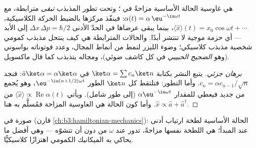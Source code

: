\begin{proposition}\label{prop:b3:harmonic-oscillator:coherent-motion}
 هي غاوسية الحالة الأساسية مزاحةً في ؛ وتحت تطور المذبذب \emph{تبقى} مترابطة، مع
$\alpha(t) = \alpha\,\eu^{-\iu\omega t}$: فينفّذ مركزها بالضبط
الحركة الكلاسيكية، $\langle\hat x\rangle(t) =
x_0\cos\omega t + \cdots$، بينما يبقى عرضاها في الحدّ الأدنى
$\Delta x\,\Delta p = \hbar/2$ إلى الأبد --- أي حزمة موجية لا
تنتشر أبدًا. والحالات المترابطة هي كيف ينتحل مذبذب كمومي شخصية
مذبذب كلاسيكي؛ وضوء الليزر  لنمط من أنماط المجال،
وعدد فوتوناته بواسوني (وهو \emph{الضجيج الحبيبي} في كل
كاشف ضوئي)، ومجاله يتذبذب كما قال ماكسويل.
\end{proposition}

\begin{proof}[برهان جزئي]
يتبع النشر بكتابة $\ket\alpha = \sum c_n\ket n$ في
$\hat a\ket\alpha = \alpha\ket\alpha$: فنجد $c_n = \alpha c_{n-1}/\sqrt
n$. وأما التطور: فتلتقط كل $\ket n$ الطور $\eu^{-\iu(n + 1/2)\omega t}$،
وهو يُجمع من جديد فيعطي  للمقدار $\alpha\eu^{-\iu\omega t}$
(إلى طور شامل). ويأتي $\langle\hat x\rangle \propto
\operatorname{Re}\alpha(t)$ من $\hat x \propto \hat a +
\hat a^\dagger$. وأما كون الحالة هي الغاوسية المزاحة فمُسلَّم
به هنا.
\end{proof}

\begin{omfigure}

{\small صورة في  (قارن
\cref{ch:b3:hamiltonian-mechanics}): الحالة الأساسية لطخة ارتياب
أدنى عند المبدأ؛  هي اللطخة نفسها
مزاحةً، تدور عند $\omega$ من دون أن تتشوّه --- وهي أفضل ما يحاكي به
الميكانيك الكمومي اهتزازًا كلاسيكيًّا.}
\end{omfigure}

